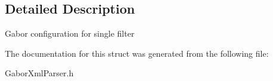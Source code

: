 \subsection{Detailed Description}
Gabor configuration for single filter 

The documentation for this struct was generated from the following file:\begin{CompactItemize}
\item 
GaborXmlParser.h\end{CompactItemize}
